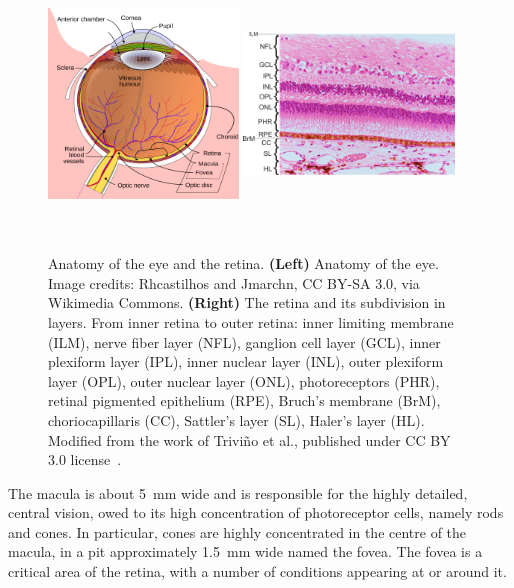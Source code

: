 \documentclass[12pt,a4paper]{journal}
\begin{document}
\begin{figure}[ht]
  \centering
  \includegraphics[width=0.45\textwidth, height=7cm]{ArchitectureEye} %
  \hfill
  \includegraphics[width=0.50\textwidth, height=7cm]{RetinalLayers}
  \caption{Anatomy of the eye and the retina. \textbf{(Left)} Anatomy of the eye. Image credits: Rhcastilhos and Jmarchn, CC BY-SA 3.0, via Wikimedia Commons. \textbf{(Right)} The retina and its subdivision in layers. From inner retina to outer retina: inner limiting membrane (ILM), nerve fiber layer (NFL), ganglion cell layer (GCL), inner plexiform layer (IPL), inner nuclear layer (INL), outer plexiform layer (OPL), outer nuclear layer (ONL), photoreceptors (PHR), retinal pigmented epithelium (RPE), Bruch's membrane (BrM), choriocapillaris (CC), Sattler's layer (SL), Haler's layer (HL). Modified from the work of Trivi\~no et al., published under CC BY 3.0 license~\cite{Trivino_2012}.}
  \label{fig:architecture-eye}
\end{figure}

The macula is about \SI{5}{\mm} wide and is responsible for the highly detailed, central vision, owed to its high concentration of photoreceptor cells, namely rods and cones.
In particular, cones are highly concentrated in the centre of the macula, in a pit approximately \SI{1.5}{\mm} wide named the fovea.
The fovea is a critical area of the retina, with a number of conditions appearing at or around it.
\end{document}
